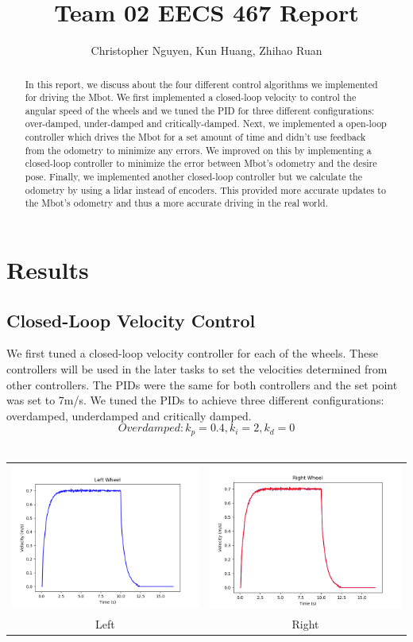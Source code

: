\documentclass[conference]{IEEEtran}
\title{Team 02 EECS 467 Report}
\author{Christopher Nguyen,  Kun Huang, Zhihao Ruan}
\begin{document}
\maketitle
\begin{abstract}
In this report, we discuss about the four different control algorithms we implemented for driving the Mbot. We first implemented a closed-loop velocity to control the angular speed of the wheels and we tuned the PID for three different configurations: over-damped, under-damped and critically-damped. Next, we implemented a open-loop controller which drives the Mbot for a set amount of time and didn't use feedback from the odometry to minimize any errors. We improved on this by implementing a closed-loop controller to minimize the error between Mbot's odometry and the desire pose. Finally, we implemented another closed-loop controller but we calculate the odometry by using a lidar instead of encoders. This provided more accurate updates to the Mbot's odometry and thus a more accurate driving in the real world.
\end{abstract}

\section{Results}
\subsection{Closed-Loop Velocity Control}
We first tuned a closed-loop velocity controller for each of the wheels. These controllers will be used in the later tasks to set the velocities determined from other controllers. The PIDs were the same for both controllers and the set point was set to 7m/s. We tuned the PIDs to achieve three different configurations: overdamped, underdamped and critically damped.
\[ Overdamped: k_p=0.4, k_i=2, k_d=0 \]\\
\begin{tabular}{cc}
\includegraphics[width=0.45\linewidth]{step_0_4_2_0_left.png} & \includegraphics[width=0.45\linewidth]{step_0_4_2_0_right.png} \\
Left & Right \\[6pt]
\end{tabular}
\end{document}
